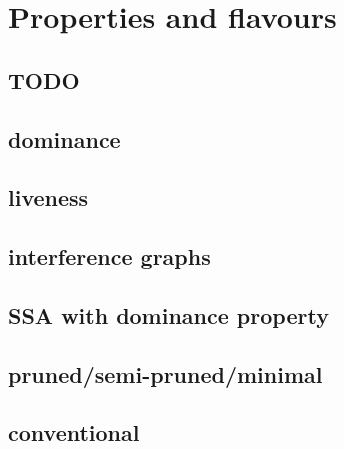 \applynumberofpages\chapter{Properties and flavours }
\section{TODO}

\section{dominance}
\section{liveness}
\section{interference graphs}
\section{SSA with dominance property}
\section{pruned/semi-pruned/minimal}
\section{conventional}

